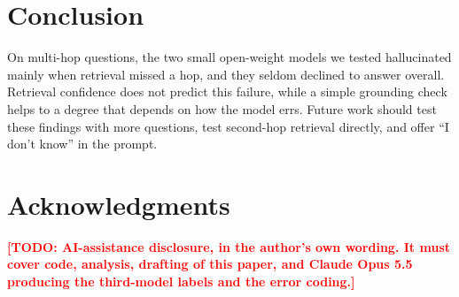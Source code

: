 \documentclass[10pt,a4paper,twocolumn]{article}
\newcommand{\todo}[1]{\textcolor{red}{\textbf{[TODO: #1]}}}
\begin{document}
\section{Conclusion}
On multi-hop questions, the two small open-weight models we tested hallucinated mainly when retrieval missed a hop, and they seldom declined to answer overall. Retrieval confidence does not predict this failure, while a simple grounding check helps to a degree that depends on how the
model errs. Future work should test these findings with more questions, test second-hop retrieval directly, and offer ``I don't know'' in the prompt.

\section*{Acknowledgments}
\todo{AI-assistance disclosure, in the author's own wording. It must cover code, analysis, drafting of this paper, and Claude Opus 5.5 producing the third-model labels and the error coding.}

{\small


}
\end{document}
